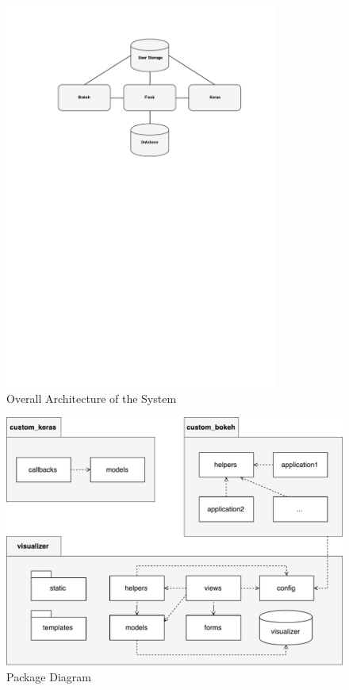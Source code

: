 \begin{figure}[h!]
    \centering
        \includegraphics[width=0.8\textwidth]{fig/overall-architecture.pdf}
        \caption{Overall Architecture of the System}
        \label{architecture1}
\end{figure}

\begin{figure}[h!]
    \centering
        \includegraphics[width=\textwidth]{fig/package-diagram.pdf}
        \caption{Package Diagram}
        \label{architecture2}
\end{figure}

